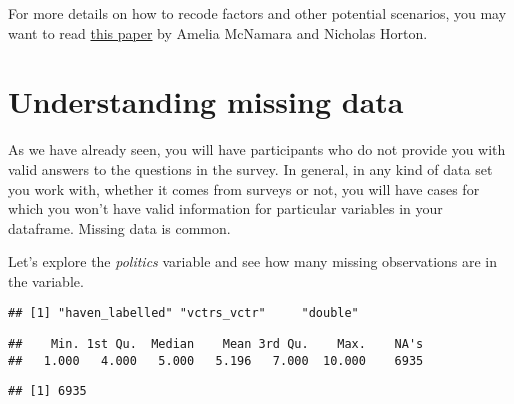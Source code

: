 \documentclass[
]{book}
\newenvironment{Shaded}{\begin{snugshade}}{\end{snugshade}}
\newcommand{\FunctionTok}[1]{\textcolor[rgb]{0.13,0.29,0.53}{\textbf{#1}}}
\newcommand{\NormalTok}[1]{#1}
\newcommand{\SpecialCharTok}[1]{\textcolor[rgb]{0.81,0.36,0.00}{\textbf{#1}}}
\begin{document}
For more details on how to recode factors and other potential scenarios, you may want to read \href{https://peerj.com/preprints/3163/}{this paper} by Amelia McNamara and Nicholas Horton.

\section{Understanding missing data}\label{understanding-missing-data}

As we have already seen, you will have participants who do not provide you with valid answers to the questions in the survey. In general, in any kind of data set you work with, whether it comes from surveys or not, you will have cases for which you won't have valid information for particular variables in your dataframe. Missing data is common.

Let's explore the \emph{politics} variable and see how many missing observations are in the variable.

\begin{Shaded}
\end{Shaded}

\begin{verbatim}
## [1] "haven_labelled" "vctrs_vctr"     "double"
\end{verbatim}

\begin{Shaded}
\end{Shaded}

\begin{verbatim}
##    Min. 1st Qu.  Median    Mean 3rd Qu.    Max.    NA's 
##   1.000   4.000   5.000   5.196   7.000  10.000    6935
\end{verbatim}

\begin{Shaded}
\end{Shaded}

\begin{verbatim}
## [1] 6935
\end{verbatim}
\end{document}
